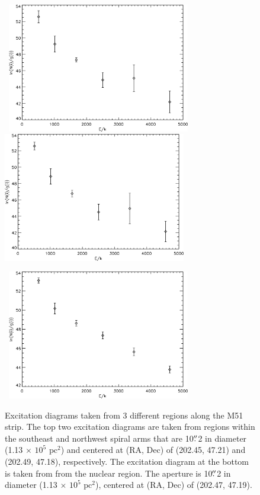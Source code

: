 \documentclass[manuscript]{aastex}
\begin{document}
\begin{figure}[!h]
\centerline{\hbox{ \hspace{0.0in} 
\includegraphics[width=8cm,angle=0]{region1.jpg}
\hspace{0.1in}
\includegraphics[width=8cm,angle=0]{region3.jpg}}}
\end{figure}

\begin{figure}[!h]
\centerline{\hbox{\hspace{0.0in}
\includegraphics[width=8cm,angle=0]{region2.jpg}}}
\caption{Excitation diagrams taken from 3 different regions along the M51 strip.  The top two excitation diagrams are taken from regions within the southeast and northwest spiral arms that are 10$\mbox{$.\!\!^{\prime\prime}$}$2 in diameter (1.13 $\times$ $\mathrm{10^5}$ $\mathrm{pc^2}$) and centered at (RA, Dec) of (202.45, 47.21) and (202.49, 47.18), respectively. The excitation diagram at the bottom is taken from from the nuclear region.  The aperture is 10$\mbox{$.\!\!^{\prime\prime}$}$2 in diameter (1.13 $\times$ $\mathrm{10^5}$ $\mathrm{pc^2}$), centered at (RA, Dec) of (202.47, 47.19).
\label{fig2}}
\end{figure}
\end{document}

